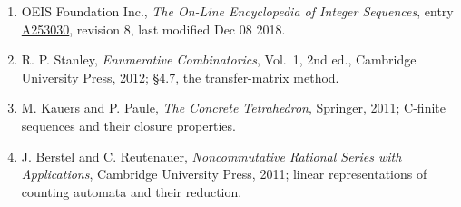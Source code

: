\documentclass[11pt]{article}
\theoremstyle{definition}
\begin{document}
\begin{enumerate}

\item OEIS Foundation Inc., \emph{The On-Line Encyclopedia of Integer Sequences}, entry \href{https://oeis.org/A253030}{A253030}, revision 8, last modified Dec 08 2018.

\item R. P. Stanley, \emph{Enumerative Combinatorics}, Vol.~1, 2nd ed., Cambridge University Press, 2012; \S4.7, the transfer-matrix method.

\item M. Kauers and P. Paule, \emph{The Concrete Tetrahedron}, Springer, 2011; C-finite sequences and their closure properties.

\item J. Berstel and C. Reutenauer, \emph{Noncommutative Rational Series with Applications}, Cambridge University Press, 2011; linear representations of counting automata and their reduction.

\end{enumerate}
\end{document}
